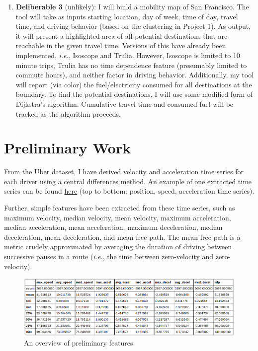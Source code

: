 \documentclass[12pt]{article}
\begin{document}
\begin{enumerate}
\item \textbf{Deliberable 3} (unlikely): I will build a mobility map of San Francisco. The tool will take as inputs starting location, day of week, time of day, travel time, and driving behavior (based on the clustering in Project 1). As output, it will present a highlighted area of all potential destinations that are reachable in the given travel time. Versions of this have already been implemented, \textit{i.e.}, Isoscope and Trulia. However, Isoscope is limited to 10 minute trips, Trulia has no time dependence feature (presumably limited to commute hours), and neither factor in driving behavior. Additionally, my tool will report (via color) the fuel/electricity consumed for all destinations at the boundary. To find the potential destinations, I will use some modified form of Dijkstra's algorithm. Cumulative travel time and consumed fuel will be tracked as the algorithm proceeds.

\end{enumerate}

\section{Preliminary Work}

From the Uber dataset, I have derived velocity and acceleration time series for each driver using a central differences method. An example of one extracted time series can be found \href{https://b7097c28bb33c303afec66e136e388566fb53b52.googledrive.com/host/0Bz6ioWtHYtNJVjJacklTdHQ2cGM/}{here} (top to bottom: position, speed, acceleration time series).

Further, simple features have been extracted from these time series, such as maximum velocity, median velocity, mean velocity, maximum acceleration, median acceleration, mean acceleration, maximum deceleration, median deceleration, mean deceleration, and mean free path. The mean free path is a metric crudely approximated by averaging the duration of driving between successive pauses in a route (\textit{i.e.}, the time between zero-velocity and zero-velocity).

\begin{figure}[hbtp]
\caption{\label{fig:features}An overview of preliminary features.}
\begin{center}
\includegraphics[width=5.5in]{feature_describe.png}
\end{center}
\end{figure}
\end{document}
